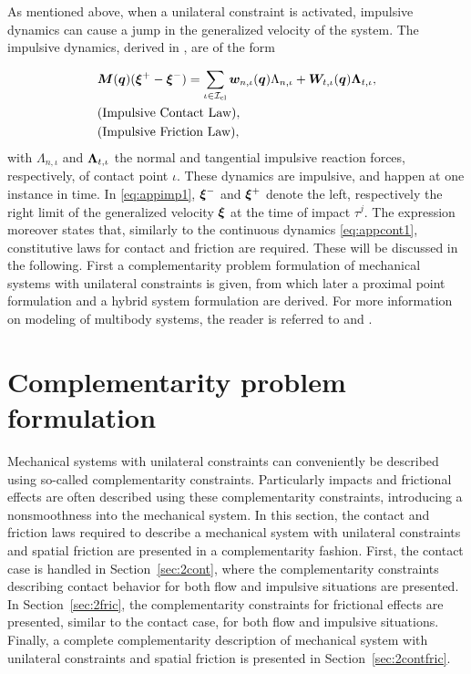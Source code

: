 \documentclass[../DC2017114Bouma.tex]{subfiles}
\begin{document}
As mentioned above, when a unilateral constraint is activated, impulsive dynamics can cause a jump in the generalized velocity of the system. The impulsive dynamics, derived in \cite[Section 5.4]{Leine2008}, are of the form

\begin{align}
&{\boldsymbol{M}}({\boldsymbol{q}})(\boldsymbol{\xi}^+ - \boldsymbol{\xi}^-) = \sum_{\iota\in\mathcal{I}_{\text{cl}}} {\boldsymbol{w}}_{n,\iota}({\boldsymbol{q}})\Lambda_{n,\iota} + {\boldsymbol{W}}_{t,\iota}({\boldsymbol{q}})\boldsymbol{\Lambda}_{t,\iota}, \label{eq:appimp1}\\
&\text{(Impulsive Contact Law)},\nonumber\\
&\text{(Impulsive Friction Law)},\nonumber
\end{align}
with $\Lambda_{n,\iota}$ and $\boldsymbol{\Lambda}_{t,\iota}$ the normal and tangential impulsive reaction forces, respectively, of contact point $\iota$. These dynamics are impulsive, and happen at one instance in time. In \eqref{eq:appimp1}, $\boldsymbol{\xi}^-$ and $\boldsymbol{\xi}^+$ denote the left, respectively the right limit of the generalized velocity $\boldsymbol{\xi}$ at the time of impact $\tau^j$. The expression moreover states that, similarly to the continuous dynamics \eqref{eq:appcont1}, constitutive laws for contact and friction are required. These will be discussed in the following. First a complementarity problem formulation of mechanical systems with unilateral constraints is given, from which later a proximal point formulation and a hybrid system formulation are derived. For more information on modeling of multibody systems, the reader is referred to \cite{Leine2008} and \cite{Wouw2016}.

\section{Complementarity problem formulation}\label{sec:comp}
Mechanical systems with unilateral constraints can conveniently be described using so-called complementarity constraints. Particularly impacts and frictional effects are often described using these complementarity constraints, introducing a nonsmoothness into the mechanical system. In this section, the contact and friction laws required to describe a mechanical system with unilateral constraints and spatial friction are presented in a complementarity fashion. First, the contact case is handled in Section~\ref{sec:2cont}, where the complementarity constraints describing contact behavior for both flow and impulsive situations are presented. In Section~\ref{sec:2fric}, the complementarity constraints for frictional effects are presented, similar to the contact case, for both flow and impulsive situations. Finally, a complete complementarity description of mechanical system with unilateral constraints and spatial friction is presented in Section~\ref{sec:2contfric}.
\end{document}
